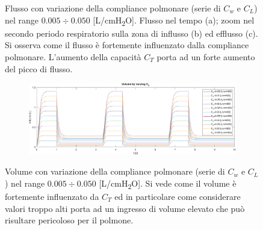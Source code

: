 \begin{figure}[t!]
\begin{subfigure}{0.5\linewidth}
		\caption{}
	\end{subfigure}\hfill
	\caption{Flusso con variazione della compliance polmonare (serie di $C_w$ e $C_L$) nel range $0.005\div 0.050$ [L/cmH\textsubscript{2}O]. Flusso nel tempo (a); zoom nel secondo periodo respiratorio sulla zona di influsso (b) ed efflusso (c). Si osserva come il flusso è fortemente influenzato dalla compliance polmonare. L'aumento della capacità $C_T$ porta ad un forte aumento del picco di flusso.}
	\begin{subfigure}{\linewidth}
		\centering
		\includegraphics[width=0.95\linewidth]{../model/data_log/CwCL_volume_total.pdf}
	\end{subfigure}\hfill
	\caption{Volume con variazione della compliance polmonare (serie di $C_w$ e $C_L$) nel range $0.005\div 0.050$ [L/cmH\textsubscript{2}O]. Si vede come il volume è fortemente influenzato da $C_T$ ed in particolare come considerare valori troppo alti porta ad un ingresso di volume elevato che può risultare pericoloso per il polmone.}
\end{figure}


